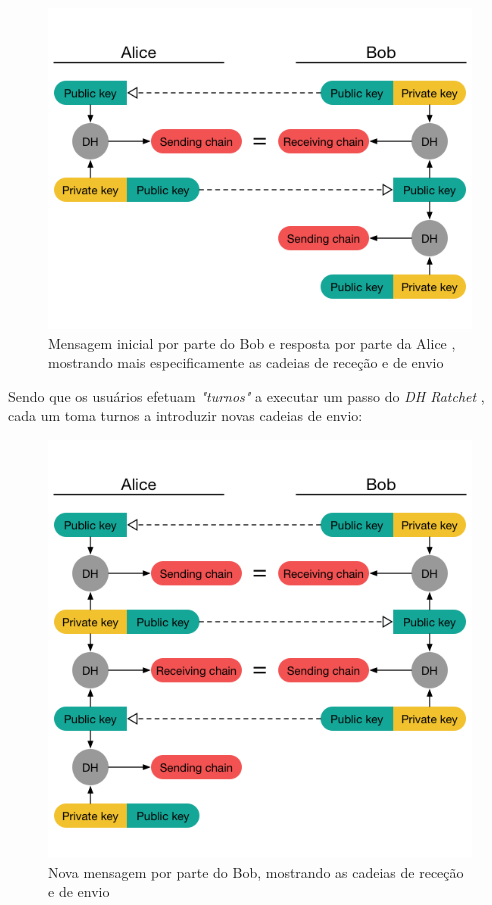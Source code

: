 \begin{figure}[H]
\begin{center}
\includegraphics[width=12cm]{img/DH5.png}
\caption{Mensagem inicial por parte do Bob e resposta por parte da Alice , mostrando mais especificamente as cadeias de receção e de envio}
\label{diagram:DH5}
\centering
\end{center}
\end{figure}

Sendo que os usuários efetuam \textit{"turnos"} a executar um passo do \textit{DH Ratchet} , cada um toma turnos a introduzir novas cadeias de envio:

\begin{figure}[H]
\begin{center}
\includegraphics[width=12cm]{img/DH6.png}
\caption{Nova mensagem por parte do Bob, mostrando as cadeias de receção e de envio}
\label{diagram:DH6}
\centering
\end{center}
\end{figure}

